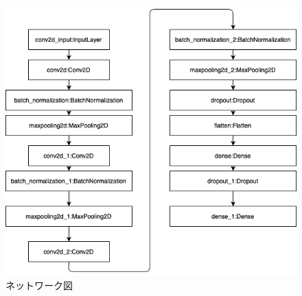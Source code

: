 \documentclass[a4paper, 11pt, titlepage]{jsarticle}
\begin{document}
\begin{figure}
 \centering
  \includegraphics[scale=0.5]{model.png}
  \caption{ネットワーク図}
  \label{network}
\end{figure}
\end{document}
